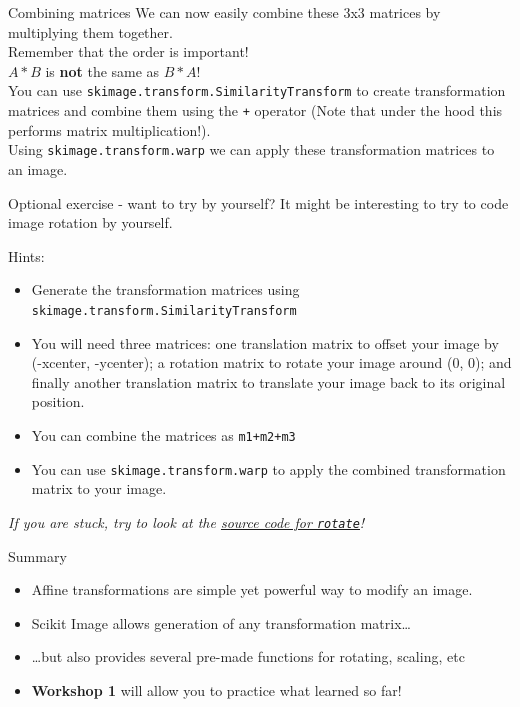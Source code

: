 \documentclass[9pt, aspectratio=169]{beamer}
\begin{document}
\begin{frame}
    {Combining matrices}
    We can now easily combine these 3x3 matrices by multiplying them together.\\
    Remember that the order is important!\\

    $A * B$ is \textbf{not} the same as $B * A$!\\

    You can use \texttt{skimage.transform.SimilarityTransform} to create transformation matrices and combine them using the \texttt{+} operator (Note that under the hood this performs matrix multiplication!). \\

    Using \texttt{skimage.transform.warp} we can apply these transformation matrices to an image.
\end{frame}

\begin{frame}
    {Optional exercise - want to try by yourself?}
    It might be interesting to try to code image rotation by yourself.

    Hints:

    \begin{itemize}
        \item Generate the transformation matrices using \texttt{skimage.transform.SimilarityTransform}
        \item You will need three matrices: one translation matrix to offset your image by (-xcenter, -ycenter); a rotation matrix to rotate your image around (0, 0); and finally another translation matrix to translate your image back to its original position.
        \item You can combine the matrices as \texttt{m1+m2+m3}
        \item You can use \texttt{skimage.transform.warp} to apply the combined transformation matrix to your image.
    \end{itemize}

    \textit{If you are stuck, try to look at the \href{https://github.com/scikit-image/scikit-image/blob/main/skimage/transform/\_warps.py\#L349-L460}{\underline{source code for \texttt{rotate}}}!}
\end{frame}

\begin{frame}
    {Summary}
    \begin{itemize}
        \item Affine transformations are simple yet powerful way to modify an image.
        \item Scikit Image allows generation of any transformation matrix\dots
        \item \dots but also provides several pre-made functions for rotating, scaling, etc
        \item \textbf{Workshop 1} will allow you to practice what learned so far!
    \end{itemize}

\end{frame}
\end{document}
